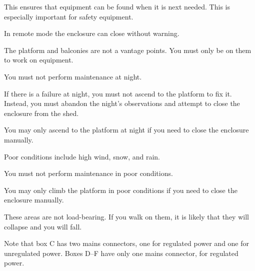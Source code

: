 
This ensures that equipment can be found when it is next needed. This is especially important for safety equipment.


In remote mode the enclosure can close without warning.


The platform and balconies are not a vantage points. You must only be on them to work on equipment.


You must not perform maintenance at night.

If there is a failure at night, you must not ascend to the platform to fix it. Instead, you must abandon the night’s observations and attempt to close the enclosure from the shed. 

You may only ascend to the platform at night if you need to close the enclosure manually.


Poor conditions include high wind, snow, and rain. 

You must not perform maintenance in poor conditions.

You may only climb the platform in poor conditions if you need to close the enclosure manually.


These areas are not load-bearing. If you walk on them, it is likely that they will collapse and you will fall.



Note that box C has two mains connectors, one for regulated power and one for unregulated power. Boxes D--F have only one mains connector, for regulated power.

